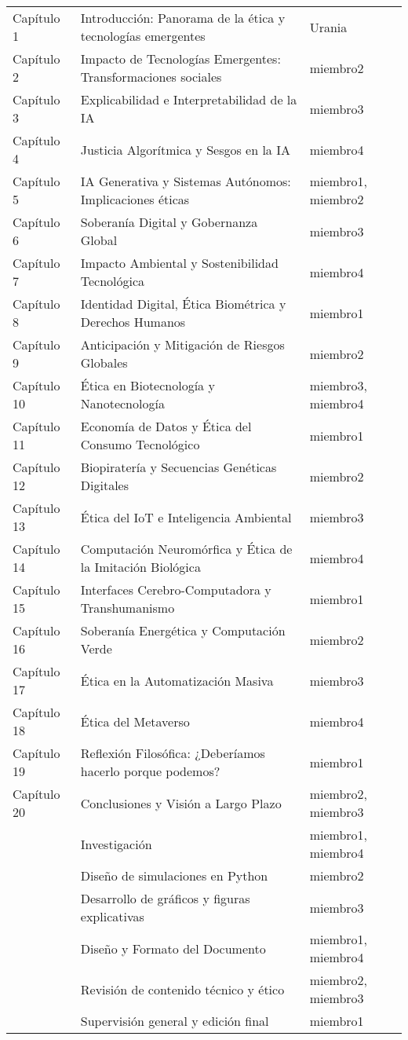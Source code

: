 \begin{table}[htb]
\begin{tabularx}{\textwidth}{lXX}
        Capítulo 1 & Introducción: Panorama de la ética y tecnologías emergentes & Urania \\
        Capítulo 2 & Impacto de Tecnologías Emergentes: Transformaciones sociales & miembro2 \\
        Capítulo 3 & Explicabilidad e Interpretabilidad de la IA & miembro3 \\
        Capítulo 4 & Justicia Algorítmica y Sesgos en la IA & miembro4 \\
        Capítulo 5 & IA Generativa y Sistemas Autónomos: Implicaciones éticas & miembro1, miembro2 \\
        Capítulo 6 & Soberanía Digital y Gobernanza Global & miembro3 \\
        Capítulo 7 & Impacto Ambiental y Sostenibilidad Tecnológica & miembro4 \\
        Capítulo 8 & Identidad Digital, Ética Biométrica y Derechos Humanos & miembro1 \\
        Capítulo 9 & Anticipación y Mitigación de Riesgos Globales & miembro2 \\
        Capítulo 10 & Ética en Biotecnología y Nanotecnología & miembro3, miembro4 \\
        Capítulo 11 & Economía de Datos y Ética del Consumo Tecnológico & miembro1 \\
        Capítulo 12 & Biopiratería y Secuencias Genéticas Digitales & miembro2 \\
        Capítulo 13 & Ética del IoT e Inteligencia Ambiental & miembro3 \\
        Capítulo 14 & Computación Neuromórfica y Ética de la Imitación Biológica & miembro4 \\
        Capítulo 15 & Interfaces Cerebro-Computadora y Transhumanismo & miembro1 \\
        Capítulo 16 & Soberanía Energética y Computación Verde & miembro2 \\
        Capítulo 17 & Ética en la Automatización Masiva & miembro3 \\
        Capítulo 18 & Ética del Metaverso & miembro4 \\
        Capítulo 19 & Reflexión Filosófica: ¿Deberíamos hacerlo porque podemos? & miembro1 \\
        Capítulo 20 & Conclusiones y Visión a Largo Plazo & miembro2, miembro3 \\

        \midrule
        & Investigación & miembro1, miembro4 \\
        & Diseño de simulaciones en Python & miembro2 \\
        & Desarrollo de gráficos y figuras explicativas & miembro3 \\
        & Diseño y Formato del Documento & miembro1, miembro4 \\
        & Revisión de contenido técnico y ético & miembro2, miembro3 \\
        & Supervisión general y edición final & miembro1 \\
        \bottomrule
    \end{tabularx}
\end{table}
